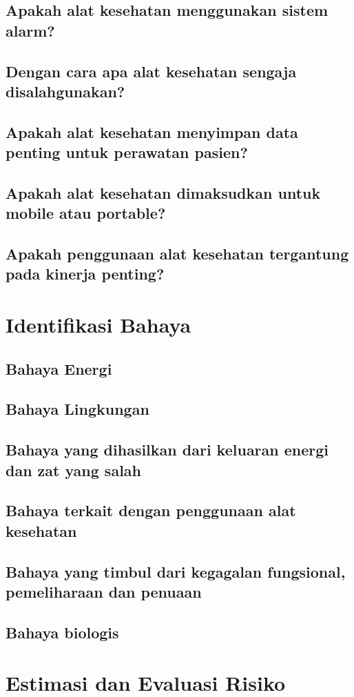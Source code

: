 \documentclass[11pt,a4paper,twoside,draft,onecolumn]{book}
\begin{document}
			\subsection{Apakah alat kesehatan menggunakan sistem alarm?}
			\subsection{Dengan cara apa alat kesehatan sengaja disalahgunakan?}
			\subsection{Apakah alat kesehatan menyimpan data penting untuk perawatan pasien?}
			\subsection{Apakah alat kesehatan dimaksudkan untuk mobile atau portable?}
			\subsection{Apakah penggunaan alat kesehatan tergantung pada kinerja penting?}
		\section{Identifikasi Bahaya}
			\subsection{Bahaya Energi}
			\subsection{Bahaya Lingkungan}
			\subsection{Bahaya yang dihasilkan dari keluaran energi dan zat yang salah}
			\subsection{Bahaya terkait dengan penggunaan alat kesehatan}
			\subsection{Bahaya yang timbul dari kegagalan fungsional, pemeliharaan dan penuaan}
			\subsection{Bahaya biologis}
		\section{Estimasi dan Evaluasi Risiko}
	\newpage
	
	
\end{document}
